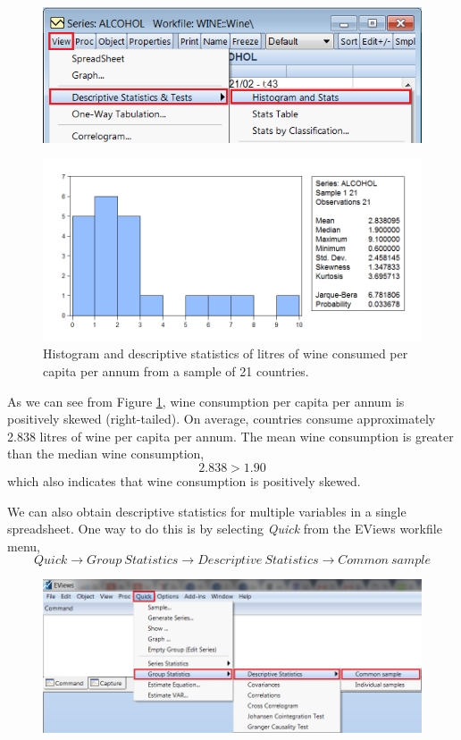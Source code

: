 \documentclass[12pt]{report}
\begin{document}
		\begin{figure}[H]
			\centerline{\includegraphics{alcohol1}}
		\end{figure}
		\vspace{-\baselineskip}
		\begin{figure}[H]
			\centerline{\includegraphics{alcohol2}}
			\caption{Histogram and descriptive statistics of litres of wine consumed per capita per annum from a sample of 21 countries.}
			\label{fig:hist1}
		\end{figure}
		\vspace{-\baselineskip}
		\noindent As we can see from Figure \ref{fig:hist1}, wine consumption per capita per annum is positively skewed (right-tailed). On average, countries consume approximately 2.838 litres of wine per capita per annum. The mean wine consumption is greater than the median wine consumption, $$2.838 > 1.90$$ which also indicates that wine consumption is positively skewed. \par
		\newpage
		\noindent We can also obtain descriptive statistics for multiple variables in a single spreadsheet. One way to do this is by selecting \textit{Quick} from the EViews workfile menu,
		$$Quick \to Group\ Statistics \to Descriptive\ Statistics \to Common\ sample$$
		\begin{figure}[H]
			\centerline{\includegraphics{q2_2}}
		\end{figure}
\end{document}
